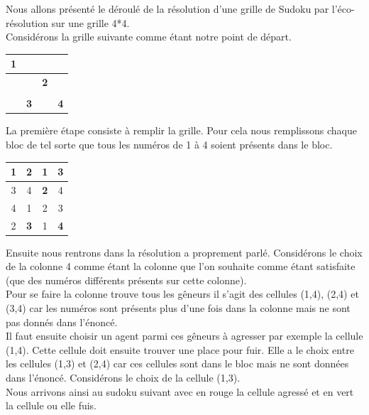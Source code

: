         	Nous allons présenté le déroulé de la résolution d'une grille de Sudoku par l'éco-résolution sur une grille 4*4.\\
        	Considérons la grille suivante comme étant notre point de départ.
        		\begin{center}
       			  \begin{tabular}{|c|c| |c|c| }
            			   \hline
            			   \textbf{1}&&&\\
            			   \hline
            			   &&\textbf{2}&\\
            	   		   \hline
               		   \hline
               		   &&&\\
                       \hline
               		   &\textbf{3}&&\textbf{4}\\                      
            			   \hline
        			 \end{tabular}
   			\end{center}
    
		
		La première étape consiste à remplir la grille. Pour cela nous remplissons chaque bloc de tel sorte que tous les numéros de 1 à 4 soient présents dans le bloc.
    
    		  \begin{center}
         		\begin{tabular}{|c|c| |c|c| }
             	 	  \hline
             	 	  \textbf{1}&2&1&3\\
             		  \hline
             		  3&4&\textbf{2}&4\\
             		  \hline
             		  \hline
             		  4&1&2&3\\
             		  \hline
             		  2&\textbf{3}&1&\textbf{4}\\                      
            			  \hline
        			\end{tabular}
    		\end{center}

	Ensuite nous rentrons dans la résolution a proprement parlé. Considérons le choix de la colonne 4 comme étant la colonne que l'on souhaite comme étant satisfaite (que des numéros différents présents sur cette colonne). \\
	Pour se faire la colonne trouve tous les gêneurs il s'agit des cellules (1,4), (2,4) et (3,4) car les numéros sont présents plus d'une fois dans la colonne mais ne sont pas donnés dans l'énoncé. \\
	Il faut ensuite choisir un agent parmi ces gêneurs à agresser par exemple la cellule (1,4). Cette cellule doit ensuite trouver une place pour fuir. Elle a le choix entre les cellules (1,3) et (2,4) car ces cellules sont dans le bloc mais ne sont données dans l'énoncé. Considérons le choix de la cellule (1,3). \\
	Nous arrivons ainsi au sudoku suivant avec en rouge la cellule agressé et en vert la cellule ou elle fuis. \\
		
